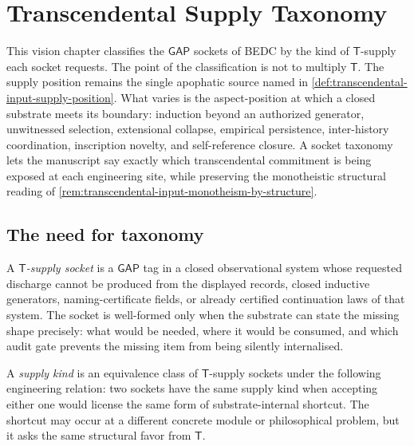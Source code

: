 \chapter{Transcendental Supply Taxonomy}
\label{ch:visions-transcendental-supply-taxonomy}

This vision chapter classifies the $\mathsf{GAP}$ sockets of BEDC by the kind of $\mathsf{T}$-supply each socket requests. The point of the classification is not to multiply $\mathsf{T}$. The supply position remains the single apophatic source named in \autoref{def:transcendental-input-supply-position}. What varies is the aspect-position at which a closed substrate meets its boundary: induction beyond an authorized generator, unwitnessed selection, extensional collapse, empirical persistence, inter-history coordination, inscription novelty, and self-reference closure. A socket taxonomy lets the manuscript say exactly which transcendental commitment is being exposed at each engineering site, while preserving the monotheistic structural reading of \autoref{rem:transcendental-input-monotheism-by-structure}.

\section{The need for taxonomy}
\label{sec:transcendental-supply-taxonomy-need}

\begin{definition}
\label{def:transcendental-supply-socket}
A \emph{$\mathsf{T}$-supply socket} is a $\mathsf{GAP}$ tag in a closed observational system whose requested discharge cannot be produced from the displayed records, closed inductive generators, naming-certificate fields, or already certified continuation laws of that system. The socket is well-formed only when the substrate can state the missing shape precisely: what would be needed, where it would be consumed, and which audit gate prevents the missing item from being silently internalised.
\end{definition}

\begin{definition}
\label{def:transcendental-supply-kind}
A \emph{supply kind} is an equivalence class of $\mathsf{T}$-supply sockets under the following engineering relation: two sockets have the same supply kind when accepting either one would license the same form of substrate-internal shortcut. The shortcut may occur at a different concrete module or philosophical problem, but it asks the same structural favor from $\mathsf{T}$.
\end{definition}

